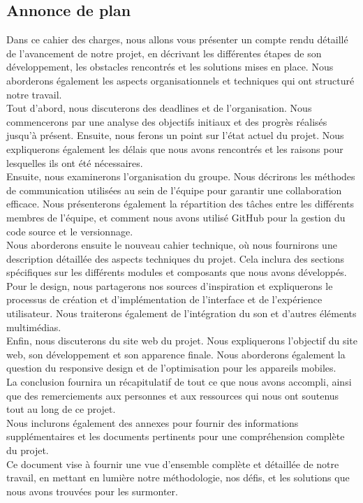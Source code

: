 \subsection{Annonce de plan}

Dans ce cahier des charges, nous allons vous présenter un compte rendu détaillé de l'avancement de notre projet, en décrivant les différentes étapes de son développement, les obstacles rencontrés et les solutions mises en place.
Nous aborderons également les aspects organisationnels et techniques qui ont structuré notre travail.
\\

Tout d'abord, nous discuterons des deadlines et de l'organisation.
Nous commencerons par une analyse des objectifs initiaux et des progrès réalisés jusqu'à présent.
Ensuite, nous ferons un point sur l'état actuel du projet. Nous expliquerons également les délais que nous avons rencontrés et les raisons pour lesquelles ils ont été nécessaires.
\\

Ensuite, nous examinerons l'organisation du groupe. Nous décrirons les méthodes de communication utilisées au sein de l'équipe pour garantir une collaboration efficace.
Nous présenterons également la répartition des tâches entre les différents membres de l'équipe, et comment nous avons utilisé GitHub pour la gestion du code source et le versionnage.
\\

Nous aborderons ensuite le nouveau cahier technique, où nous fournirons une description détaillée des aspects techniques du projet.
Cela inclura des sections spécifiques sur les différents modules et composants que nous avons développés.
\\

Pour le design, nous partagerons nos sources d'inspiration et expliquerons le processus de création et d'implémentation de l'interface et de l'expérience utilisateur.
Nous traiterons également de l'intégration du son et d'autres éléments multimédias.
\\

Enfin, nous discuterons du site web du projet.
Nous expliquerons l'objectif du site web, son développement et son apparence finale.
Nous aborderons également la question du responsive design et de l'optimisation pour les appareils mobiles.
\\

La conclusion fournira un récapitulatif de tout ce que nous avons accompli, ainsi que des remerciements aux personnes et aux ressources qui nous ont soutenus tout au long de ce projet.
\\

Nous inclurons également des annexes pour fournir des informations supplémentaires et les documents pertinents pour une compréhension complète du projet.
\\

Ce document vise à fournir une vue d'ensemble complète et détaillée de notre travail, en mettant en lumière notre méthodologie, nos défis, et les solutions que nous avons trouvées pour les surmonter.
